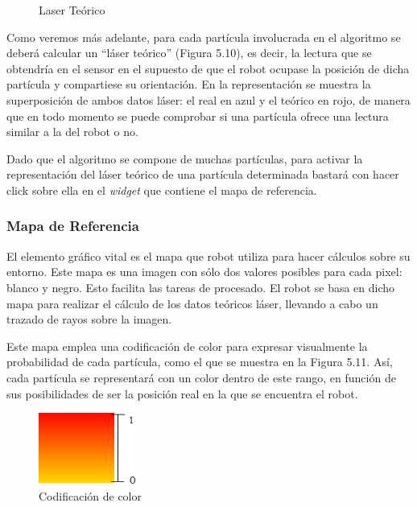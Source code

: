 \begin{enumerate}
\begin{figure}[H]
\begin{center}
			\caption{Laser Teórico}
			\label{fig.laserteorico}
			\end{center}
	\end{figure}
Como veremos más adelante, para cada partícula involucrada en el algoritmo se deberá calcular un “láser teórico” (Figura 5.10), es decir, la lectura que se obtendría en el sensor en el supuesto de que el robot ocupase la posición de dicha partícula y compartiese su orientación. En la representación se muestra la superposición de ambos datos láser: el real en azul y el teórico en rojo, de manera que en todo momento se puede comprobar si una partícula ofrece una lectura similar a la del robot o no. 

Dado que el algoritmo se compone de muchas partículas, para activar la representación del láser teórico de una partícula determinada bastará con hacer click sobre ella en el \textit{widget} que contiene el mapa de referencia.
\end{enumerate}

\subsubsection{Mapa de Referencia}
El elemento gráfico vital es el mapa que robot utiliza para hacer cálculos sobre su entorno. Este mapa es una imagen con sólo dos valores posibles para cada pixel: blanco y negro. Esto facilita las tareas de procesado. El robot se basa en dicho mapa para realizar el cálculo de los datos teóricos láser, llevando a cabo un trazado de rayos sobre la imagen. 

Este mapa emplea una codificación de color para expresar visualmente la probabilidad de cada partícula, como el que se muestra en la Figura 5.11. Así, cada partícula se representará con un color dentro de este rango, en función de sus posibilidades de ser la posición real en la que se encuentra el robot.

\begin{figure}[H]
	\begin{center}
		\includegraphics[width=0.3\textwidth]{figures/gradcolor.png}
		\caption{Codificación de color}
		\label{fig.gradcolor}
		\end{center}
\end{figure}

